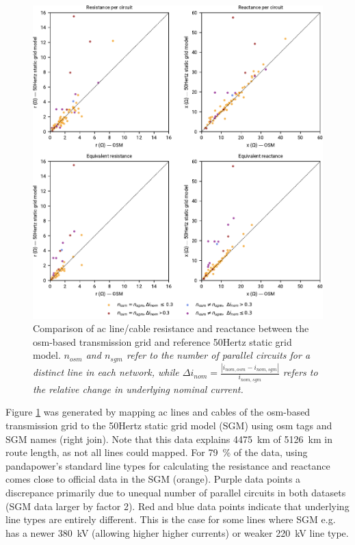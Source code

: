 \documentclass[fleqn,10pt]{wlscirep}
\let\autocite\cite
\begin{document}
\newpage
\begin{figure}[!htbp]
    \centering
    \includegraphics{figures/fig_scatter_reactance_resistance.pdf}
    \caption{Comparison of \acrshort{ac} line/cable resistance and reactance between the \acrshort{osm}-based transmission grid and reference 50Hertz static grid model.\autocite{50hertzStaticGridModel2022} \textit{$n_{osm}$ and $n_{sgm}$ refer to the number of parallel circuits for a distinct line in each network, while $\Delta i_{nom} = \frac{|i_{nom, osm} - i_{nom, sgm}|}{i_{nom,sgm}}$ refers to the relative change in underlying nominal current.}}
    \label{fig:scatter_reactance_resistance}
\end{figure}

Figure \ref{fig:scatter_reactance_resistance} was generated by mapping \acrshort{ac} lines and cables of the \acrshort{osm}-based transmission grid to the 50Hertz static grid model (SGM) using \acrshort{osm} tags and SGM names (right join). Note that this data explains \SI{4475}{\kilo\meter} of \SI{5126}{\kilo\meter} in route length, as not all lines could mapped. For \SI{79}{\percent} of the data, using pandapower's standard line types\autocite{thurnerPandapowerOpenSourcePython2018} for calculating the resistance and reactance comes close to official data in the SGM (orange). Purple data points a discrepance primarily due to unequal number of parallel circuits in both datasets (SGM data larger by factor 2). Red and blue data points indicate that underlying line types are entirely different. This is the case for some lines where SGM e.g. has a newer \SI{380}{\kilo\volt} (allowing higher higher currents) or weaker \SI{220}{\kilo\volt} line type.
\end{document}

